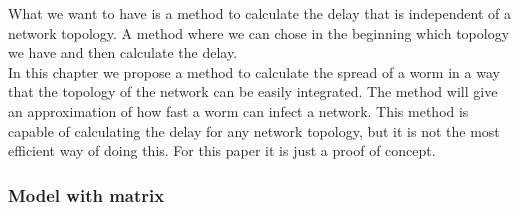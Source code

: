 What we want to have is a method to calculate the delay that is independent of a network topology. A method where we can chose in the beginning which topology we have and then calculate the delay.\\

In this chapter we propose a method to calculate the spread of a worm in a way that the topology of the network can be easily integrated. The method will give an approximation of how fast a worm can infect a network. This method is capable of calculating the delay for any network topology, but it is not the most efficient way of doing this. For this paper it is just a proof of concept.  


\subsubsection{Model with matrix}



%




